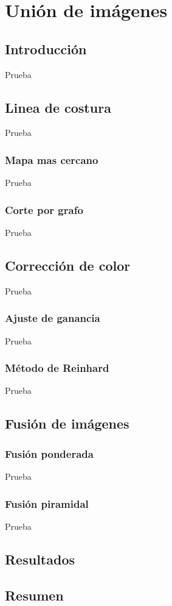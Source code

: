 \chapter{Unión de imágenes}
\label{capitulo5}


\section{Introducción}
Prueba

\section{Linea de costura}
Prueba

\subsection{Mapa mas cercano}
Prueba

\subsection{Corte por grafo}
Prueba

\section{Corrección de color}
Prueba

\subsection{Ajuste de ganancia}
Prueba

\subsection{Método de Reinhard}
Prueba

\section{Fusión de imágenes}

\subsection{Fusión ponderada}
Prueba
\subsection{Fusión piramidal}
Prueba

\section{Resultados}

\section{Resumen}


